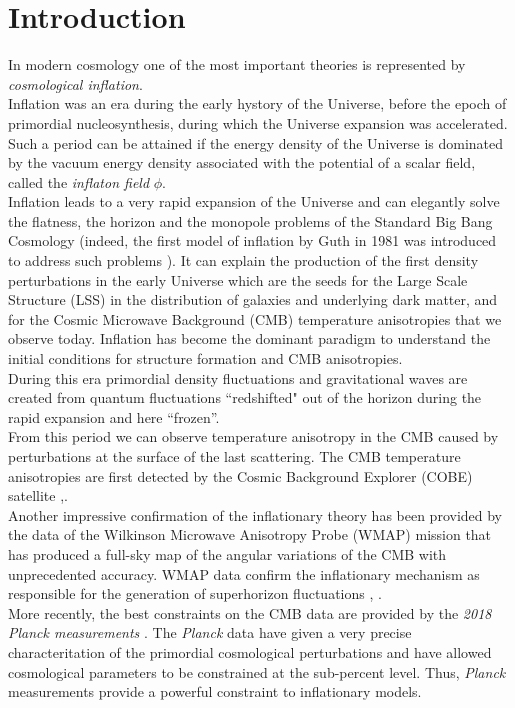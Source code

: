 \documentclass[11pt,a4paper,twoside]{book}
\begin{document}
\tableofcontents
	

\chapter{Introduction}

In modern cosmology one of the most important theories is represented by \textit{cosmological inflation}. \\
Inflation was an era during the early hystory of the Universe, before the epoch of primordial nucleosynthesis, during which the Universe expansion was accelerated. Such a period can be attained if the energy density of the Universe is dominated by the vacuum energy density associated with the potential of a scalar field, called the \textit{inflaton field} $ \phi $. \\
Inflation leads to a very rapid expansion of the Universe and can elegantly solve the flatness, the horizon and the monopole problems of the Standard Big Bang Cosmology (indeed, the first model of inflation by Guth in 1981 was introduced to address such problems \cite{Guth:Intro}). It can explain the production of the first density perturbations in the early Universe which are the seeds for the Large Scale Structure (LSS) in the distribution of galaxies and underlying dark matter, and for the Cosmic Microwave Background (CMB) temperature anisotropies that we observe today. Inflation has become the dominant paradigm to understand the initial conditions for structure formation and CMB anisotropies.\\
During this era primordial density fluctuations and gravitational waves are created from quantum fluctuations \textquotedblleft redshifted" out of the horizon during the rapid expansion and here \textquotedblleft frozen\textquotedblright.\\
From this period we can observe temperature anisotropy in the CMB caused by perturbations at the surface of the last scattering. The CMB temperature anisotropies are first detected by the Cosmic Background Explorer (COBE) satellite \cite{COBE1:intro},\cite{COBE2:intro}. \\
Another impressive confirmation of the inflationary theory has been provided by the data of the Wilkinson Microwave Anisotropy Probe (WMAP) mission that has produced a full-sky map of the angular variations of the CMB with unprecedented accuracy. WMAP data confirm the inflationary mechanism as responsible for the generation of superhorizon fluctuations \cite{WMAP:intro}, \cite{NonGauss:Intro}.\\
More recently, the best constraints on the CMB data are provided by the \textit{2018 Planck measurements} \cite{Planck2018:intro}. The \textit{Planck} data have given a very precise characteritation of the primordial cosmological perturbations and have allowed cosmological parameters to be constrained at the sub-percent level. Thus, \textit{Planck} measurements provide  a powerful constraint to inflationary models.\\
\end{document}
